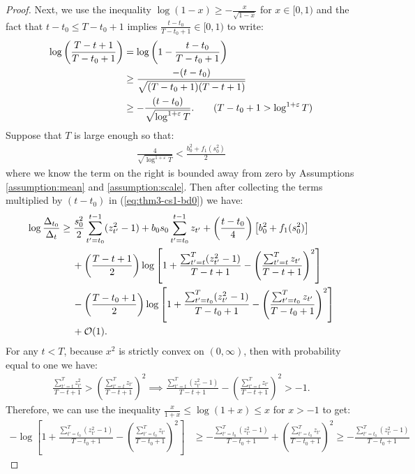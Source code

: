 \begin{proof}
Next, we use the inequality $\log(1 - x) \geq -\frac{x}{\sqrt{1-x}}$ for $x \in [0,1)$ and the fact that $t - t_0 \leq T-t_0+1$ implies $\frac{t-t_0}{T-t_0+1}\in [0,1)$ to write: 
\begin{align*}
    \log \left(\frac{T-t+1}{T-t_0+1}\right) &= \log\left(1 - \frac{t-t_0}{T-t_0+1}\right) \\
    &\geq \frac{-(t-t_0)}{\sqrt{(T-t_0+1)(T-t+1)}}  \\
    &\geq -\frac{(t-t_0)}{\sqrt{\log^{1+\varepsilon} T}}. \tag{$T-t_0+1 > \log^{1+\varepsilon} T$}
\end{align*}
Suppose that $T$ is large enough so that: 
\begin{align*}
    \frac{4}{\sqrt{\log^{1+\varepsilon} T}} < \frac{b_0^2+ f_1(s_0^2)}{2}
\end{align*}
where we know the term on the right is bounded away from zero by Assumptions \ref{assumption:mean} and \ref{assumption:scale}. Then after collecting the terms multiplied by $(t-t_0)$ in (\ref{eq:thm3-cs1-bd0}) we have: 
\begin{align}
    \log \frac{\Delta_{t_0}}{\Delta_t} &\geq  \frac{s_0^2}{2} \sum_{t' = t_0}^{t - 1} (z_{t'}^2-1) + b_0 s_0 \sum_{t' = t_0}^{t - 1} z_{t'} + \left(\frac{t-t_0}{4}\right)\left[b_0^2 + f_1(s_0^2)\right] \notag \\
    &\quad\: + \left(\frac{T - t +1}{2}\right)\log\left[1 + \frac{\sum_{t'=t}^T (z_{t'}^2-1)}{T-t+1} - \left(\frac{\sum_{t'=t}^T z_{t'}}{T-t+1}\right)^2\right]\notag \\
    &\quad\: -\left(\frac{T - t_0 +1}{2}\right)\log\left[1 + \frac{\sum_{t'=t_0}^T (z_{t'}^2 -1)}{T-t_0+1} - \left(\frac{\sum_{t'=t_0}^T z_{t'}}{T-t_0+1}\right)^2\right] \notag \\
    &\quad\: + \mathcal{O}(1). \label{eq:thm3-cs1-bd1}
\end{align}
For any $t < T$, because $x^2$ is strictly convex on $(0,\infty)$, then with probability equal to one we have:
\begin{align}
      \frac{\sum_{t'=t}^T z_{t'}^2}{T-t+1} > \left(\frac{\sum_{t'=t}^T z_{t'}}{T-t+1}\right)^2 \implies \frac{\sum_{t'=t}^T (z_{t'}^2 -1)}{T-t+1} - \left(\frac{\sum_{t'=t}^T z_{t'}}{T-t+1}\right)^2 > -1. \label{eq:neg1-bd}
\end{align}
Therefore, we can use the inequality $\frac{x}{1+x} \leq \log(1+x) \leq x$ for $x > -1$ to get:
\small
\begin{align*}
    -\log\left[1 + \frac{\sum_{t'=t_0}^T (z_{t'}^2 -1)}{T-t_0+1} - \left(\frac{\sum_{t'=t_0}^T z_{t'}}{T-t_0+1}\right)^2\right] &\geq -\frac{\sum_{t'=t_0}^T (z_{t'}^2 -1)}{T-t_0+1} + \left(\frac{\sum_{t'=t_0}^T z_{t'}}{T-t_0+1}\right)^2 \geq -\frac{\sum_{t'=t_0}^T (z_{t'}^2 -1)}{T-t_0+1}

\end{align*}
\end{proof}

